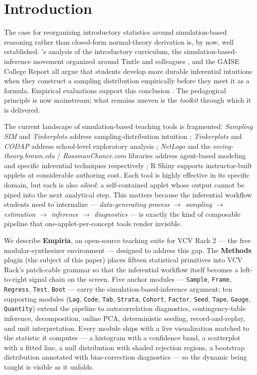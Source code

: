 \section{Introduction}\label{introduction}

The case for reorganizing introductory statistics around
simulation-based reasoning rather than closed-form normal-theory
derivation is, by now, well established. \citet{cobb2007}'s
analysis of the introductory curriculum, the
simulation-based-inference movement organized around Tintle and
colleagues \citep{tintle2014}, and the GAISE College Report
\citep{gaise2016} all argue that students develop more durable
inferential intuitions when they construct a sampling distribution
empirically before they meet it as a formula. Empirical evaluations
support this conclusion \citep{chance2004, delmas2007}. The
pedagogical principle is now mainstream; what remains uneven is the
\emph{toolkit} through which it is delivered.

The current landscape of simulation-based teaching tools is
fragmented: \emph{Sampling SIM} and \emph{Tinkerplots} address
sampling-distribution intuition \citep{konold2008}; \emph{Tinkerplots}
and \emph{CODAP} address school-level exploratory analysis
\citep{finzer2013}; \emph{NetLogo} and the
\emph{seeing-theory.brown.edu} / \emph{RossmanChance.com} libraries
address agent-based modeling and specific inferential techniques
respectively \citep{wilensky1999}; R Shiny supports
instructor-built applets at considerable authoring cost. Each tool
is highly effective in its specific domain, but each is also
\emph{siloed}: a self-contained applet whose output cannot be piped
into the next analytical step. This matters because the inferential
workflow students need to internalize ---
\emph{data-generating process $\rightarrow$ sampling $\rightarrow$
estimation $\rightarrow$ inference $\rightarrow$ diagnostics} ---
is exactly the kind of composable pipeline that
one-applet-per-concept tools render invisible.

We describe \textbf{Empiria}, an open-source teaching suite for VCV
Rack 2 \citep{vcv-rack} --- the free modular-synthesizer environment
--- designed to address this gap. The \textbf{Methods} plugin (the
subject of this paper) places fifteen statistical primitives into
VCV Rack's patch-cable grammar so that the inferential workflow
itself becomes a left-to-right signal chain on the screen. Five
anchor modules --- \texttt{Sample}, \texttt{Frame}, \texttt{Regress},
\texttt{Test}, \texttt{Boot} --- carry the
simulation-based-inference argument; ten supporting modules
(\texttt{Lag}, \texttt{Code}, \texttt{Tab}, \texttt{Strata},
\texttt{Cohort}, \texttt{Factor}, \texttt{Seed}, \texttt{Tape},
\texttt{Gauge}, \texttt{Quantity}) extend the pipeline to
autocorrelation diagnostics, contingency-table inference,
decomposition, online PCA, deterministic seeding, record-and-replay,
and unit interpretation. Every module ships with a live
visualization matched to the statistic it computes --- a histogram
with a confidence band, a scatterplot with a fitted line, a null
distribution with shaded rejection regions, a bootstrap distribution
annotated with bias-correction diagnostics --- so the dynamic being
taught is visible as it unfolds.

